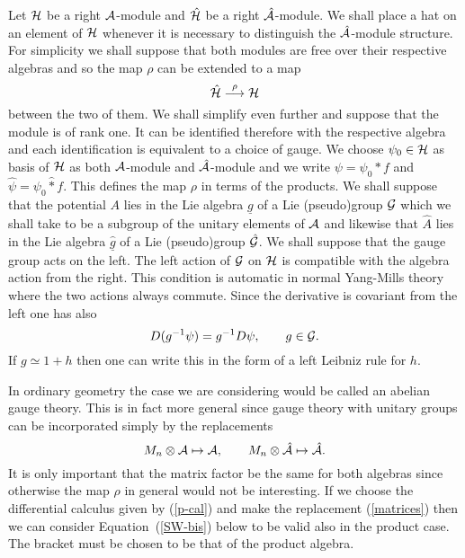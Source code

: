 \documentclass[a4paper,12pt]{article}
\def\h#1{\hat #1}
\def\c#1{{\cal #1}}
\def\wm{\mathbin{*}}
\def\hwm{\mathbin{\hat *}}
\begin{document}
Let $\c{H}$ be a right $\c{A}$-module and $\h{\c{H}}$ be
a right $\h{\c}{A}$-module.  We shall place a hat on an element of $\c{H}$
whenever it is necessary to distinguish the $\h{\c}{A}$-module structure.
For simplicity we shall suppose that both modules
are free over their respective algebras and so the map $\rho$ can be
extended to a map
$$
\h{\c{H}} \buildrel \rho \over \longrightarrow \c{H}
$$
between the two of them. We shall simplify even further and suppose
that the module is of rank one. It can be identified therefore with
the respective algebra and each identification is equivalent to a
choice of gauge. We choose $\psi_0 \in \c{H}$ as basis of $\c{H}$
as both $\c{A}$-module and $\h{\c}{A}$-module and we write
$\psi = \psi_0 \wm f$ and $\h{\psi} = \psi_0 \hwm f$. This defines the
map $\rho$ in terms of the products.  We shall suppose that the
potential $A$ lies in the Lie algebra $\underline{g}$ of a Lie
(pseudo)group $\c{G}$ which we shall take to be a subgroup of the
unitary elements of $\c{A}$ and likewise that $\h{A}$ lies in the Lie
algebra $\underline{\h{g}}$ of a Lie (pseudo)group $\h{\c}{G}$.  We
shall suppose that the gauge group acts on the left. The left action
of $\c{G}$ on $\c{H}$ is compatible with the algebra action from the
right. This condition is automatic in normal Yang-Mills theory where
the two actions always commute.  Since the derivative is covariant
from the left one has also
$$
D (g^{-1} \psi) = g^{-1} D\psi, \qquad g \in \c{G}.
$$
If $g \simeq 1 + h$ then one can write this in the form of a left
Leibniz rule for $h$.

In ordinary geometry the case we are considering would be called an
abelian gauge theory.  This is in fact more general since
gauge theory with unitary groups can be incorporated simply by the
replacements
\begin{equation}
M_n \otimes \c{A} \mapsto  \c{A}, \qquad
M_n \otimes \h{\c}{A} \mapsto \h{\c}{A}.                  \label{matrices}
\end{equation}
It is only important that the matrix factor be the same for both
algebras since otherwise the map $\rho$ in general would not be
interesting.  If we choose the differential calculus given by
(\ref{p-cal}) and make the replacement (\ref{matrices}) then we can
consider Equation~(\ref{SW-bis}) below to be valid also in the product
case.  The bracket must be chosen to be that of the product algebra.
\end{document}
